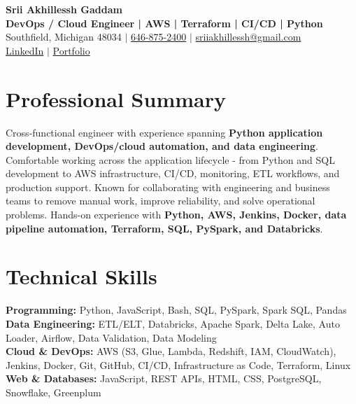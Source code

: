 \documentclass[letterpaper,10pt]{article}
\begin{document}
\fontsize{9.35pt}{10.45pt}\selectfont

\begin{center}
    {\LARGE \textbf{Srii Akhillessh Gaddam}} \\[-1pt]
    \textbf{DevOps / Cloud Engineer | AWS | Terraform | CI/CD | Python} \\[2pt]
    Southfield, Michigan 48034 $|$
    \href{tel:6468752400}{646-875-2400} $|$
    \href{mailto:sriiakhillessh@gmail.com}{sriiakhillessh@gmail.com} \\[1pt]
    \href{https://www.linkedin.com/in/srii-akhiilessh-gaddam-b48668191/}{LinkedIn} $|$
    \href{https://sriiakhillesshg.github.io/portfolio/}{Portfolio}
\end{center}
\vspace{-8pt}

\section{Professional Summary}
\small{Cross-functional engineer with experience spanning \textbf{Python application development, DevOps/cloud automation, and data engineering}. Comfortable working across the application lifecycle - from Python and SQL development to AWS infrastructure, CI/CD, monitoring, ETL workflows, and production support. Known for collaborating with engineering and business teams to remove manual work, improve reliability, and solve operational problems. Hands-on experience with \textbf{Python, AWS, Jenkins, Docker, data pipeline automation, Terraform, SQL, PySpark, and Databricks}.}

\section{Technical Skills}
\small{
\textbf{Programming:} Python, JavaScript, Bash, SQL, PySpark, Spark SQL, Pandas \\
\textbf{Data Engineering:} ETL/ELT, Databricks, Apache Spark, Delta Lake, Auto Loader, Airflow, Data Validation, Data Modeling \\
\textbf{Cloud \& DevOps:} AWS (S3, Glue, Lambda, Redshift, IAM, CloudWatch), Jenkins, Docker, Git, GitHub, CI/CD, Infrastructure as Code, Terraform, Linux \\
\textbf{Web \& Databases:} JavaScript, REST APIs, HTML, CSS, PostgreSQL, Snowflake, Greenplum
}
\end{document}
